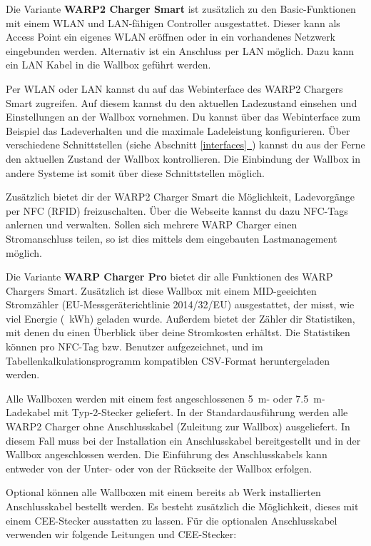 \documentclass[a4paper,10pt]{article}
\newcommand*{\fullref}[1]{Abschnitt \hyperref[{#1}]{\ref*{#1}~\nameref*{#1}}}
\begin{document}
\begin{multicols*}{2}
    Die Variante \textbf{WARP2 Charger Smart} ist zusätzlich zu den
	Basic-Funktionen mit einem WLAN und
    LAN-fähigen Controller ausgestattet.
    Dieser kann als \nohyphens{Access} Point ein eigenes WLAN eröffnen oder in
    ein vorhandenes Netzwerk eingebunden werden. Alternativ ist ein Anschluss
    per LAN möglich. Dazu kann ein LAN Kabel in die Wallbox geführt werden.

    Per WLAN oder LAN kannst du auf das Webinterface des WARP2 Chargers Smart
    zugreifen. Auf diesem kannst du den aktuellen Ladezustand einsehen und
    Einstellungen an der Wallbox vornehmen. Du kannst über das Webinterface
    zum Beispiel das Ladeverhalten und die maximale Ladeleistung konfigurieren.
    Über verschiedene Schnittstellen (siehe \fullref{interfaces}) kannst du aus der Ferne
	den aktuellen Zustand der Wallbox kontrollieren. Die Einbindung der Wallbox in
	andere Systeme ist somit über diese Schnittstellen möglich.

    Zusätzlich bietet dir der WARP2 Charger Smart die Möglichkeit, Ladevorgänge
    per NFC (RFID) freizuschalten. Über die Webseite kannst du dazu NFC-Tags
    anlernen und verwalten. Sollen sich mehrere WARP Charger einen
	Stromanschluss teilen, so ist dies mittels dem eingebauten Lastmanagement
	möglich.

    Die Variante \textbf{WARP Charger Pro} bietet dir alle Funktionen des WARP Chargers Smart.
    Zusätzlich ist diese Wallbox mit einem MID-geeichten Stromzähler (EU-Messgeräterichtlinie 2014/32/EU)
    ausgestattet, der misst, wie viel Energie (\SI{}{\kWh}) geladen
    wurde. Außerdem bietet der Zähler dir Statistiken, mit denen du einen Überblick über deine
    Stromkosten erhältst. Die Statistiken können pro NFC-Tag bzw. Benutzer aufgezeichnet,
    und im Tabellenkalkulationsprogramm kompatiblen CSV-Format
    heruntergeladen werden.

    Alle Wallboxen werden mit einem fest angeschlossenen
    \SI{5}{\meter}- oder \SI{7,5}{\meter}-Ladekabel mit Typ-2-Stecker geliefert.
    In der Standardausführung werden alle WARP2 Charger ohne Anschlusskabel
    (Zuleitung zur Wallbox) ausgeliefert. In diesem Fall muss bei der Installation
    ein Anschlusskabel bereitgestellt und in der Wallbox angeschlossen werden.
    Die Einführung des Anschlusskabels kann entweder von der Unter- oder von
    der Rückseite der Wallbox erfolgen.

    Optional können alle Wallboxen mit einem bereits ab Werk
    installierten Anschlusskabel bestellt werden. Es besteht zusätzlich die
    Möglichkeit, dieses mit einem CEE-Stecker ausstatten zu lassen.
    Für die optionalen Anschluss\-kabel verwenden wir folgende Leitungen und CEE-Stecker:


\end{multicols*}
\end{document}
